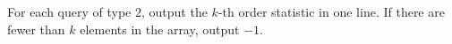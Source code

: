 For each query of type $2$, output the $k$-th order statistic in one line.
If there are fewer than $k$ elements in the array, output $-1$.